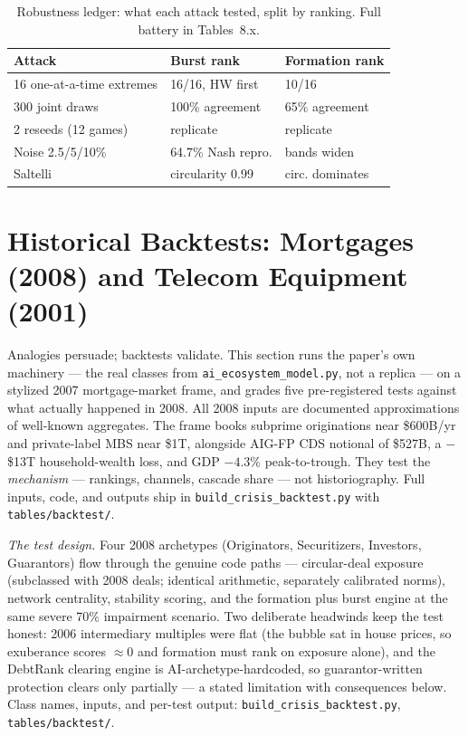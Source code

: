 \documentclass[11pt,a4paper]{article}
\begin{document}
\begin{table}[htbp]
\centering
\caption{Robustness ledger: what each attack tested, split by ranking. Full battery in Tables~8.x.}
    \label{tab:12-robustness-ledger-what-each}
\begin{tabular}{lll}
\toprule
Attack & Burst rank & Formation rank \\
\midrule
16 one-at-a-time extremes & 16/16, HW first & 10/16 \\
300 joint draws & 100\% agreement & 65\% agreement \\
2 reseeds (12 games) & replicate & replicate \\
Noise 2.5/5/10\% & 64.7\% Nash repro. & bands widen \\
Saltelli & circularity 0.99 & circ. dominates \\
\bottomrule
\end{tabular}
\end{table}

\section{Historical Backtests: Mortgages (2008) and Telecom Equipment (2001)}\label{sec:backtest}
Analogies persuade; backtests validate. This section runs the paper's own
machinery --- the real classes from \texttt{ai\_ecosystem\_model.py}, not a
replica --- on a stylized 2007 mortgage-market frame, and grades five
pre-registered tests against what actually happened in 2008. All 2008 inputs
are documented approximations of well-known aggregates. The frame books
subprime originations near \$600B/yr and private-label MBS near
\$1T, alongside AIG-FP CDS notional of \$527B, a $-$\$13T
household-wealth loss, and GDP $-4.3\%$ peak-to-trough. They test the
\emph{mechanism} --- rankings, channels, cascade share --- not
historiography. Full inputs, code, and outputs ship in
\texttt{build\_crisis\_backtest.py} with \texttt{tables/backtest/}.

\emph{The test design.} Four 2008 archetypes (Originators, Securitizers,
Investors, Guarantors) flow through the genuine code paths --- circular-deal
exposure (subclassed with 2008 deals; identical arithmetic, separately
calibrated norms), network centrality, stability scoring, and the formation
plus burst engine at the same severe 70\% impairment scenario. Two
deliberate headwinds keep the test honest: 2006 intermediary multiples were
flat (the bubble sat in house prices, so exuberance scores $\approx$0 and
formation must rank on exposure alone), and the DebtRank clearing engine is
AI-archetype-hardcoded, so guarantor-written protection clears only
partially --- a stated limitation with consequences below. Class names,
inputs, and per-test output: \texttt{build\_crisis\_backtest.py},
\texttt{tables/backtest/}.
\end{document}
